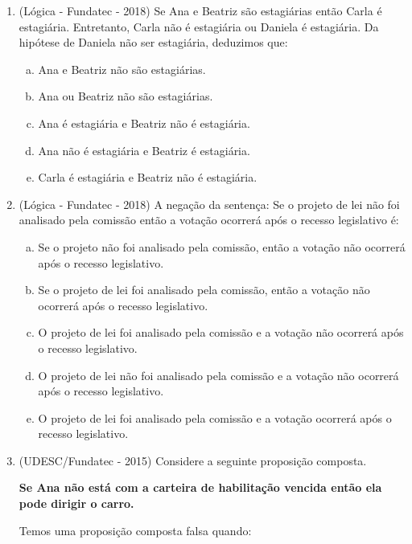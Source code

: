 \begin{enumerate}
\item (Lógica - Fundatec - 2018) Se Ana e Beatriz são estagiárias então Carla é estagiária. Entretanto, Carla não é estagiária ou Daniela é estagiária. Da hipótese de Daniela não ser estagiária, deduzimos que:
\begin{enumerate}[a)]
\item Ana e Beatriz não são estagiárias.
\item Ana ou Beatriz não são estagiárias.
\item Ana é estagiária e Beatriz não é estagiária.
\item Ana não é estagiária e Beatriz é estagiária.
\item Carla é estagiária e Beatriz não é estagiária.
\end{enumerate}

\item (Lógica - Fundatec - 2018) A negação da sentença: Se o projeto de lei não foi analisado pela comissão então a votação ocorrerá após o recesso legislativo é:
\begin{enumerate}[a)]
\item Se o projeto não foi analisado pela comissão, então a votação não ocorrerá após o recesso legislativo.
\item Se o projeto de lei foi analisado pela comissão, então a votação não ocorrerá após o recesso legislativo.
\item O projeto de lei foi analisado pela comissão e a votação não ocorrerá após o recesso legislativo.
\item O projeto de lei não foi analisado pela comissão e a votação não ocorrerá após o recesso legislativo.
\item O projeto de lei foi analisado pela comissão e a votação ocorrerá após o recesso legislativo.
\end{enumerate}

  \item (UDESC/Fundatec - 2015) Considere a seguinte proposição composta.

  \textbf{Se Ana não está com a carteira de habilitação vencida então ela pode dirigir o carro.}

  Temos uma proposição composta falsa quando:


\end{enumerate}
